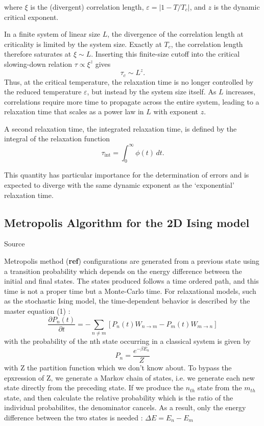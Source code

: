 where $\xi$ is the (divergent) correlation length,
$\varepsilon = |1 - T/T_c|$, and $z$ is the dynamic critical exponent.

In a finite system of linear size $L$, the divergence of the correlation
length at criticality is limited by the system size. Exactly at $T_c$,
the correlation length therefore saturates at $\xi \sim L$. Inserting
this finite-size cutoff into the critical slowing-down relation
$\tau \propto \xi^{z}$ gives
\begin{equation}
\tau_c \sim L^{z}.
\end{equation}
Thus, at the critical temperature, the relaxation time is no longer
controlled by the reduced temperature $\varepsilon$, but instead by the
system size itself. As $L$ increases, correlations require more time to
propagate across the entire system, leading to a relaxation time that
scales as a power law in $L$ with exponent $z$.


A second relaxation time, the integrated relaxation time, is defined by the
integral of the relaxation function
\begin{equation}
\tau_{\mathrm{int}} = \int_{0}^{\infty} \phi(t)\, dt.
\end{equation}

This quantity has particular importance for the determination of errors and
is expected to diverge with the same dynamic exponent as the `exponential'
relaxation time.


\subsection{Metropolis Algorithm for the 2D Ising model}

Source \cite{CompAndCrit}

Metropolis method (\textbf{ref}) configurations are
generated from a previous state using a transition probability which depends
on the energy difference between the initial and final states. The states produced follows a time ordered path, and this time is not a proper time but a Monte-Carlo time. 
For relaxational models, such as the stochastic Ising model, the time-dependent behavior is described by the master equation (1) : 
\begin{equation}
\frac{\partial P_n(t)}{\partial t}
= - \sum_{n \neq m} \left[ P_n(t) W_{n \to m} - P_m(t) W_{m \to n} \right]
\end{equation} 
with the probability of the nth state occurring in a classical system is given by
\[P_n = \frac{e^{-\beta E_n}}{Z}\] with Z the partition function which we don't know about. To bypass the epxression of Z, we generate a Markov chain of states, i.e. we generate each new state directly from the preceding state. If we produce the $n_{th}$ state from the $m_{th}$ state, and then calculate the
relative probability which is the ratio of the individual probabilites, the denominator cancels. As a result, only the energy difference between the two states is needed : $\Delta E = E_n - E_m$

